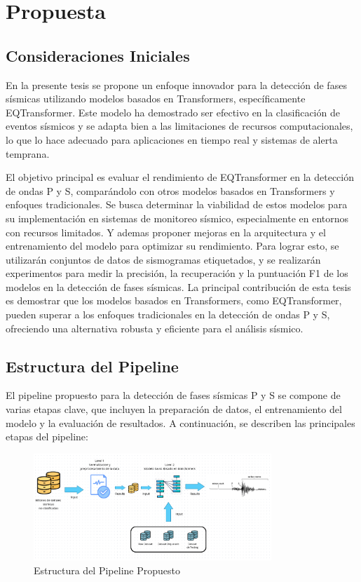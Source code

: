 \chapter{Propuesta}\label{approach}

\section{Consideraciones Iniciales}
En la presente tesis se propone un enfoque innovador para la detección de fases sísmicas utilizando modelos basados en Transformers, específicamente EQTransformer. Este modelo ha demostrado ser efectivo en la clasificación de eventos sísmicos y se adapta bien a las limitaciones de recursos computacionales, lo que lo hace adecuado para aplicaciones en tiempo real y sistemas de alerta temprana.

El objetivo principal es evaluar el rendimiento de EQTransformer en la detección de ondas P y S, comparándolo con otros modelos basados en Transformers y enfoques tradicionales. Se busca determinar la viabilidad de estos modelos para su implementación en sistemas de monitoreo sísmico, especialmente en entornos con recursos limitados. Y ademas proponer mejoras en la arquitectura y el entrenamiento del modelo para optimizar su rendimiento. Para lograr esto, se utilizarán conjuntos de datos de sismogramas etiquetados, y se realizarán experimentos para medir la precisión, la recuperación y la puntuación F1 de los modelos en la detección de fases sísmicas. La principal contribución de esta tesis es demostrar que los modelos basados en Transformers, como EQTransformer, pueden superar a los enfoques tradicionales en la detección de ondas P y S, ofreciendo una alternativa robusta y eficiente para el análisis sísmico.

\section{Estructura del Pipeline}

El pipeline propuesto para la detección de fases sísmicas P y S se compone de varias etapas clave, que incluyen la preparación de datos, el entrenamiento del modelo y la evaluación de resultados. A continuación, se describen las principales etapas del pipeline:

\begin{figure}
\centering
\includegraphics[width=0.8\textwidth]{figures/PIPELINE.png}
\caption{Estructura del Pipeline Propuesto}
\label{fig:pipeline}
\end{figure}

